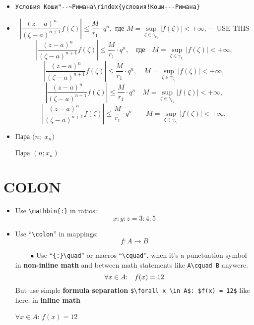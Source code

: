 \documentclass[a5paper,openany,9pt]{extbook}
\begin{document}
\begin{itemize}
\item \verb|Условия Коши"--~Римана\rindex{условия!Коши---Римана}|

\item 
$$
\left| \frac{(z - a)^n}{(\zeta - a)^{n + 1}} f(\zeta) \right| \le \frac{M}{r_1} \cdot q^n, \text{ где }  M = \sup_{\zeta \in \gamma_{r_1}} |f(\zeta)| < +\infty, \text{--- USE THIS}
$$
$$
\left| \frac{(z - a)^n}{(\zeta - a)^{n + 1}} f(\zeta) \right| \le \frac{M}{r_1} \cdot q^n, \quad \text{где} \quad M = \sup_{\zeta \in \gamma_{r_1}} |f(\zeta)| < +\infty,
$$
$$
\left| \frac{(z - a)^n}{(\zeta - a)^{n + 1}} f(\zeta) \right| \le \frac{M}{r_1} \cdot q^n,  \quad M = \sup_{\zeta \in \gamma_{r_1}} |f(\zeta)| < +\infty,
$$
$$
\left| \frac{(z - a)^n}{(\zeta - a)^{n + 1}} f(\zeta) \right| \le \frac{M}{r_1} \cdot q^n \quad M = \sup_{\zeta \in \gamma_{r_1}} |f(\zeta)| < +\infty,
$$
$$
\left| \frac{(z - a)^n}{(\zeta - a)^{n + 1}} f(\zeta) \right| \le \frac{M}{r_1} \cdot q^n \qquad M = \sup_{\zeta \in \gamma_{r_1}} |f(\zeta)| < +\infty,
$$

\item

Пара $(n$;~$x_n)$

Пара $(n; x_n)$
\end{itemize}

\section{COLON}

\begin{itemize}
\item
Use \verb|\mathbin{:}| in ratios:
$$x\mathbin{:}y\mathbin{:}z = 3\mathbin{:}4\mathbin{:}5$$

\item
Use ``\verb=\colon='' in mappings:
$$f\colon A \to B$$

\item[\colorbox{prpl}{\textcolor{white}{MY}}\ $\bullet$]
Use ``\verb={:}\quad='' or macros ``\verb=\cquad='', when it's a punctuation symbol in \textbf{non-inline math} and between math statements like \verb|A\cquad B| anywere.
$$\forall x \in A{:}\quad f(x) = 12$$
But use simple \textbf{formula separation} \verb|$\forall x \in A$: $f(x) = 12$| like here: in \textbf{inline math}
\begin{center}
$\forall x \in A$: $f(x) = 12$
\end{center}


\end{itemize}
	
\end{document}
